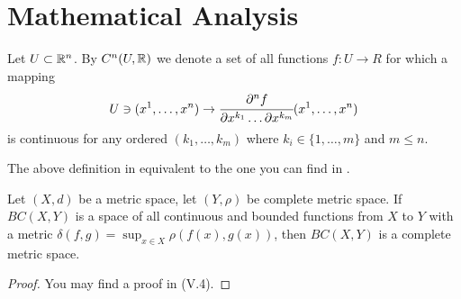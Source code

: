 \documentclass[main.tex]{subfiles}
\begin{document}
\section{Mathematical Analysis}
\begin{definition}
Let $U\subset \mathbb{R}^n$.
By $C^n(U, \mathbb{R})$ we denote a set of all functions $f:U\to R$ for which a mapping
\begin{equation}
    U\ni (x^1, \dots, x^n) \to \cfrac{\partial^n f}{\partial x^{k_1} \dots \partial x^{k_m} } (x^1, \dots, x^n)
\end{equation}
is continuous for any ordered $(k_1, \dots, k_m)$ where $k_i\in\{1, \dots, m\}$ and $m\leq n$.
\end{definition}

The above definition in equivalent to the one you can find in \cite{warner1983}. 

\begin{theorem}
\label{continous_functions_space_complete}
Let $(X, d)$ be a metric space, let $(Y, \rho)$ be complete metric space. If $BC(X, Y)$ is a space of all continuous and bounded functions from $X$ to $Y$ with a metric $\delta(f, g) = \sup_{x\in X} \rho(f(x), g(x))$, then $BC(X, Y)$ is a complete metric space.
\end{theorem}
\begin{proof}
You may find a proof in \cite{maurin1976} (V.4).
\end{proof}
\end{document}
